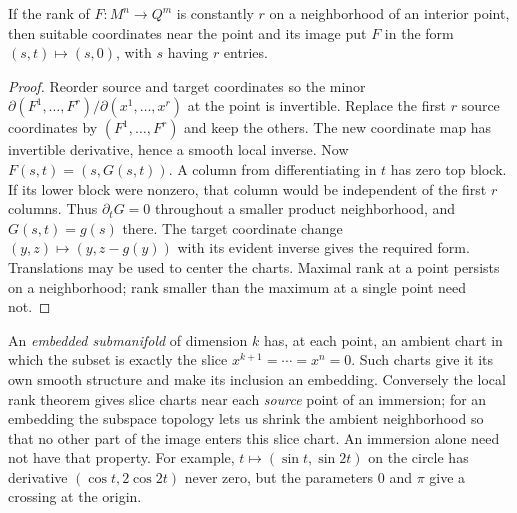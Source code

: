 \begin{theorem}\label{f:rank}
If the rank of $F:M^n\to Q^m$ is constantly $r$ on a neighborhood of an interior point, then suitable coordinates near the point and its image put $F$ in the form $(s,t)\mapsto(s,0)$, with $s$ having $r$ entries.
\end{theorem}
\begin{proof}
Reorder source and target coordinates so the minor $\partial(F^1,\ldots,F^r)/\partial(x^1,\ldots,x^r)$ at the point is invertible. Replace the first $r$ source coordinates by $(F^1,\ldots,F^r)$ and keep the others. The new coordinate map has invertible derivative, hence a smooth local inverse. Now $F(s,t)=(s,G(s,t))$. A column from differentiating in $t$ has zero top block. If its lower block were nonzero, that column would be independent of the first $r$ columns. Thus $\partial_tG=0$ throughout a smaller product neighborhood, and $G(s,t)=g(s)$ there. The target coordinate change $(y,z)\mapsto(y,z-g(y))$ with its evident inverse gives the required form. Translations may be used to center the charts. Maximal rank at a point persists on a neighborhood; rank smaller than the maximum at a single point need not.
\end{proof}
An \emph{embedded submanifold} of dimension $k$ has, at each point, an ambient chart in which the subset is exactly the slice $x^{k+1}=\cdots=x^n=0$. Such charts give it its own smooth structure and make its inclusion an embedding. Conversely the local rank theorem gives slice charts near each \emph{source} point of an immersion; for an embedding the subspace topology lets us shrink the ambient neighborhood so that no other part of the image enters this slice chart. An immersion alone need not have that property. For example, $t\mapsto(\sin t,\sin 2t)$ on the circle has derivative $(\cos t,2\cos 2t)$ never zero, but the parameters $0$ and $\pi$ give a crossing at the origin.

